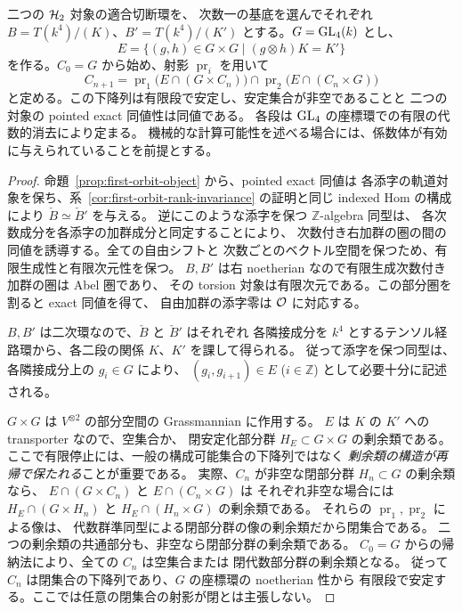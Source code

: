 \begin{proposition}[四生成元による有限同値判定]
\label{prop:first-orbit-finite-equivalence}
二つの $\mathcal H_2$ 対象の適合切断環を、
次数一の基底を選んでそれぞれ $B=T(k^4)/(K)$、$B'=T(k^4)/(K')$
とする。$G=\operatorname{GL}_4(k)$ とし、
\[
 E=\{(g,h)\in G\times G\mid (g\otimes h)K=K'\}
\]
を作る。$C_0=G$ から始め、射影 $\operatorname{pr}_i$ を用いて
\[
 C_{n+1}=\operatorname{pr}_1\bigl(E\cap(G\times C_n)\bigr)
         \cap\operatorname{pr}_2\bigl(E\cap(C_n\times G)\bigr)
\]
と定める。この下降列は有限段で安定し、安定集合が非空であることと
二つの対象の pointed exact 同値性は同値である。
各段は $\operatorname{GL}_4$ の座標環での有限の代数的消去により定まる。
機械的な計算可能性を述べる場合には、係数体が有効に与えられていることを前提とする。
\end{proposition}

\begin{proof}
命題~\ref{prop:first-orbit-object} から、pointed exact 同値は
各添字の軌道対象を保ち、系~\ref{cor:first-orbit-rank-invariance} の証明と同じ
indexed Hom の構成により $\check B\simeq\check B'$ を与える。
逆にこのような添字を保つ $\mathbb Z$-algebra 同型は、
各次数成分を各添字の加群成分と同定することにより、
次数付き右加群の圏の間の同値を誘導する。全ての自由シフトと
次数ごとのベクトル空間を保つため、有限生成性と有限次元性を保つ。
$B,B'$ は右 noetherian なので有限生成次数付き加群の圏は Abel 圏であり、
その torsion 対象は有限次元である。この部分圏を割ると exact 同値を得て、
自由加群の添字零は $\mathcal O$ に対応する。

$B,B'$ は二次環なので、$\check B$ と $\check B'$ はそれぞれ
各隣接成分を $k^4$ とするテンソル経路環から、各二段の関係 $K$、$K'$ を課して得られる。
従って添字を保つ同型は、各隣接成分上の $g_i\in G$ により、
$(g_i,g_{i+1})\in E$ ($i\in\mathbb Z$) として必要十分に記述される。

$G\times G$ は $V^{\otimes2}$ の部分空間の Grassmannian に作用する。
$E$ は $K$ の $K'$ への transporter なので、空集合か、
閉安定化部分群 $H_E\subset G\times G$ の剰余類である。
ここで有限停止には、一般の構成可能集合の下降列ではなく
\emph{剰余類の構造が再帰で保たれる}ことが重要である。
実際、$C_n$ が非空な閉部分群 $H_n\subset G$ の剰余類なら、
$E\cap(G\times C_n)$ と $E\cap(C_n\times G)$ は
それぞれ非空な場合には
$H_E\cap(G\times H_n)$ と $H_E\cap(H_n\times G)$ の剰余類である。
それらの $\operatorname{pr}_1,\operatorname{pr}_2$ による像は、
代数群準同型による閉部分群の像の剰余類だから閉集合である。
二つの剰余類の共通部分も、非空なら閉部分群の剰余類である。
$C_0=G$ からの帰納法により、全ての $C_n$ は空集合または
閉代数部分群の剰余類となる。
従って $C_n$ は閉集合の下降列であり、$G$ の座標環の noetherian 性から
有限段で安定する。ここでは任意の閉集合の射影が閉とは主張しない。


\end{proof}
